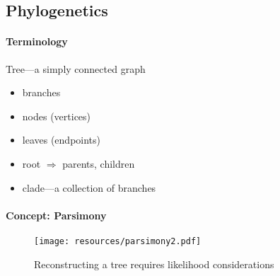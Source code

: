 \documentclass{beamer}
\begin{document}
\begin{darkframes}







  \section{Phylogenetics}

    \begin{frame}{\secname}
      \framesubtitle{Terminology}


      Tree---a simply connected graph

      \begin{itemize}
        \item branches

        \item nodes (vertices)

        \item leaves (endpoints)

        \item root $\Rightarrow$ parents, children

        \item clade---a collection of branches

      \end{itemize}
    \end{frame}



    \begin{frame}{\secname}

      \framesubtitle{Concept: Parsimony}

      \begin{figure}
        \texttt{[image: resources/parsimony2.pdf]}
        \caption{\footnotesize Reconstructing a tree requires likelihood considerations}
      \end{figure}
      \footnotesize


\end{frame}
\end{darkframes}
\end{document}
